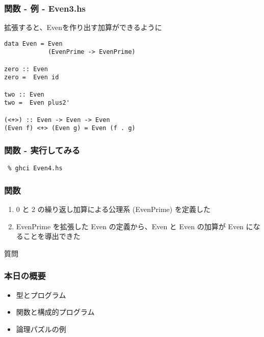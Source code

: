 \documentclass[cjk,dvipdfm,14pt]{beamer}
\begin{document}
\begin{frame}[fragile]
\frametitle{関数 - 例 - Even3.hs}

拡張すると、Evenを作り出す加算ができるように
\begin{lstlisting}
data Even = Even
            (EvenPrime -> EvenPrime)

zero :: Even
zero =  Even id

two :: Even
two =  Even plus2'

(<+>) :: Even -> Even -> Even
(Even f) <+> (Even g) = Even (f . g)
\end{lstlisting}

\end{frame}

\begin{frame}[fragile]
\frametitle{関数 - 実行してみる}

\begin{lstlisting}
 % ghci Even4.hs
\end{lstlisting}

\end{frame}


\begin{frame}[fragile]
\frametitle{関数}

\begin{enumerate}
\item 0 と 2 の繰り返し加算による公理系 (EvenPrime) を定義した
\item EvenPrime を拡張した Even の定義から、Even と Even の加算が Even になることを導出できた
\end{enumerate}

\end{frame}

\begin{frame}[fragile]
質問
\end{frame}

\begin{frame}[fragile]
\frametitle{本日の概要}

\begin{itemize}
\item 型とプログラム
\item 関数と構成的プログラム
\item { \color{red} 論理パズルの例 }
\end{itemize}

\end{frame}


\end{document}
